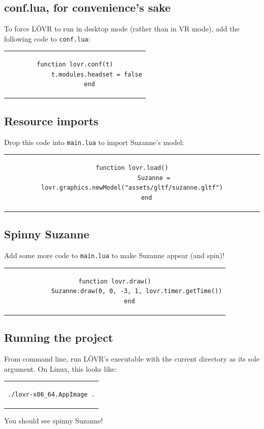\documentclass[12pt, letterpaper]{article}
\begin{document}
\subsection{conf.lua, for convenience's sake}
To force L{\"O}VR to run in desktop mode (rather than in VR mode), add the following code to \verb|conf.lua|:
\begin{center}
    \begin{tabular}{c}
        \begin{lstlisting}[language={[5.2]Lua},basicstyle=\footnotesize]
        function lovr.conf(t)
            t.modules.headset = false
        end
        \end{lstlisting}
    \end{tabular}
\end{center}

\subsection{Resource imports}
Drop this code into \verb|main.lua| to import Suzanne's model:
\begin{center}
    \begin{tabular}{c}
        \begin{lstlisting}[language={[5.2]Lua},basicstyle=\footnotesize]
        function lovr.load()
            Suzanne = lovr.graphics.newModel("assets/gltf/suzanne.gltf")
        end
        \end{lstlisting}
    \end{tabular}
\end{center}

\subsection{Spinny Suzanne}
Add some more code to \verb|main.lua| to make Suzanne appear (and spin)!
\begin{center}
    \begin{tabular}{c}
        \begin{lstlisting}[language={[5.2]Lua},basicstyle=\footnotesize]
        function lovr.draw()
            Suzanne:draw(0, 0, -3, 1, lovr.timer.getTime())
        end
        \end{lstlisting}
    \end{tabular}
\end{center}

\subsection{Running the project}
From command line, run L{\"O}VR's executable with the current directory as its sole argument. On Linux, this looks like:
\begin{center}
    \begin{tabular}{c}
        \begin{lstlisting}[language=Bash,basicstyle=\footnotesize]
            ./lovr-x86_64.AppImage .
        \end{lstlisting}
    \end{tabular}
\end{center}
You should see spinny Suzanne!
\end{document}
